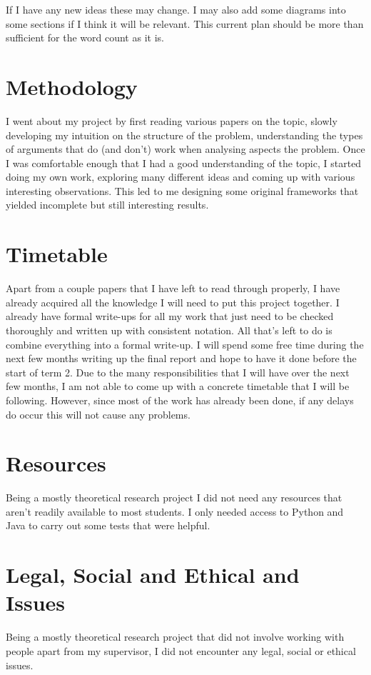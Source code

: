 \documentclass{article}
\begin{document}
If I have any new ideas these may change. I may also add some diagrams into some sections if I think it will be relevant. This current plan should be more than sufficient for the word count as it is.

\section{Methodology}

I went about my project by first reading various papers on the topic, slowly developing my intuition on the structure of the problem, understanding the types of arguments that do (and don't) work when analysing aspects the problem. Once I was comfortable enough that I had a good understanding of the topic, I started doing my own work, exploring many different ideas and coming up with various interesting observations. This led to me designing some original frameworks that yielded incomplete but still interesting results.

\section{Timetable}

Apart from a couple papers that I have left to read through properly, I have already acquired all the knowledge I will need to put this project together. I already have formal write-ups for all my work that just need to be checked thoroughly and written up with consistent notation. All that's left to do is combine everything into a formal write-up. I will spend some free time during the next few months writing up the final report and hope to have it done before the start of term 2. Due to the many responsibilities that I will have over the next few months, I am not able to come up with a concrete timetable that I will be following. However, since most of the work has already been done, if any delays do occur this will not cause any problems.

\section{Resources}

Being a mostly theoretical research project I did not need any resources that aren't readily available to most students. I only needed access to Python and Java to carry out some tests that were helpful.

\section{Legal, Social and Ethical and Issues}

Being a mostly theoretical research project that did not involve working with people apart from my supervisor, I did not encounter any legal, social or ethical issues.
\end{document}

